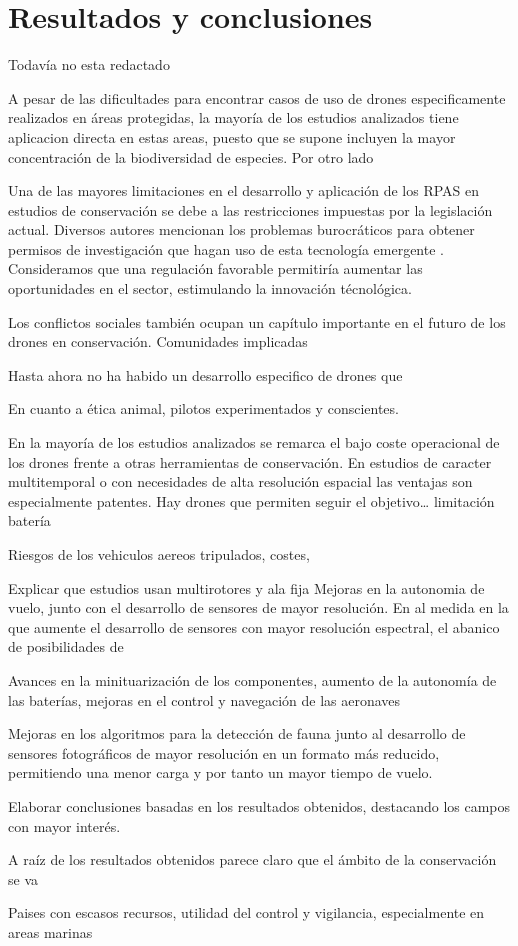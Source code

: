 \documentclass[9t,twocolumn]{article}
\begin{document}
\citep{Ditmer2015}

\section{Resultados y conclusiones}\label{resultados-y-conclusiones}

Todavía no esta redactado

A pesar de las dificultades para encontrar casos de uso de drones
especificamente realizados en áreas protegidas, la mayoría de los
estudios analizados tiene aplicacion directa en estas areas, puesto que
se supone incluyen la mayor concentración de la biodiversidad de
especies. Por otro lado

Una de las mayores limitaciones en el desarrollo y aplicación de los
RPAS en estudios de conservación se debe a las restricciones impuestas
por la legislación actual. Diversos autores mencionan los problemas
burocráticos para obtener permisos de investigación que hagan uso de
esta tecnología emergente \citep{FEE:FEE201513274}. Consideramos que una
regulación favorable permitiría aumentar las oportunidades en el sector,
estimulando la innovación técnológica.

Los conflictos sociales también ocupan un capítulo importante en el
futuro de los drones en conservación. Comunidades implicadas

Hasta ahora no ha habido un desarrollo especifico de drones que

En cuanto a ética animal, pilotos experimentados y conscientes.

En la mayoría de los estudios analizados se remarca el bajo coste
operacional de los drones frente a otras herramientas de conservación.
En estudios de caracter multitemporal o con necesidades de alta
resolución espacial las ventajas son especialmente patentes. Hay drones
que permiten seguir el objetivo\ldots{} limitación batería

Riesgos de los vehiculos aereos tripulados, costes,

Explicar que estudios usan multirotores y ala fija Mejoras en la
autonomia de vuelo, junto con el desarrollo de sensores de mayor
resolución. En al medida en la que aumente el desarrollo de sensores con
mayor resolución espectral, el abanico de posibilidades de

Avances en la minituarización de los componentes, aumento de la
autonomía de las baterías, mejoras en el control y navegación de las
aeronaves

Mejoras en los algoritmos para la detección de fauna junto al desarrollo
de sensores fotográficos de mayor resolución en un formato más reducido,
permitiendo una menor carga y por tanto un mayor tiempo de vuelo.

Elaborar conclusiones basadas en los resultados obtenidos, destacando
los campos con mayor interés.

A raíz de los resultados obtenidos parece claro que el ámbito de la
conservación se va

Paises con escasos recursos, utilidad del control y vigilancia,
especialmente en areas marinas

\newpage
\singlespacing 

\end{document}
